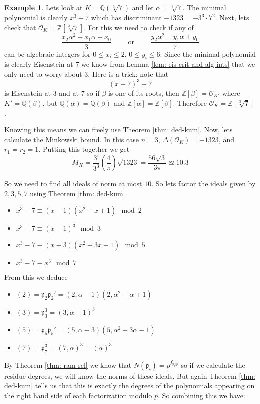 \documentclass[11pt,a4paper]{report}
\theoremstyle{plain}
\theoremstyle{definition}
\newtheorem{exmp}[subsection]{Example}
\theoremstyle{definition}
\newcommand{\ZZ}{\mathbb{Z}}
\def\QQ{\mathbb{Q}}
\def\gothp{\mathfrak{p}}
\def \a{\alpha}
\def \OO {\mathcal{O}}
\begin{document}
\begin{exmp}
	Lets look at $K=\QQ(\sqrt[3]{7})$ and let $\a=\sqrt[3]{7}$. The minimal polynomial is clearly $x^3-7$ which has discriminant $-1323=-3^3 \cdot7^2$. Next, lets check that $\OO_K=\ZZ[\sqrt[3]{7}]$. For this we need to check if any of \[\frac{x_2\a^2+x_1\a+x_0}{3} \qquad \text{ or } \qquad \frac{y_2\a^2+y_1\a+y_0}{7}\] can be algebraic integers for $0 \leq x_i \leq 2$, $0\leq y_i \leq 6$. Since the minimal polynomial is clearly Eisenstein at $7$ we know from Lemma \ref{lem: eis crit and alg ints} that we only need to worry about $3$. Here is a trick: note that \[(x+7)^3-7\] is Eisenstein at $3$ and at $7$ so if $\beta$ is one of its roots, then $\ZZ[\beta]=\OO_{K'}$ where $K'=\QQ(\beta)$, but $\QQ(\a)=\QQ(\beta)$ and $\ZZ[\a]=\ZZ[\beta]$. Therefore $\OO_K=\ZZ[\sqrt[3]{7}]$.
	
	Knowing this means we can freely use Theorem \ref{thm: ded-kum}. Now, lets calculate the Minkowski bound. In this case $n=3$, $\Delta(\OO_K)=-1323$, and $r_1=r_2=1$. Putting this together we get \[M_K=\frac{3!}{3^3}\left(\frac{4}{\pi}\right) \sqrt{1323}= \frac{56\sqrt{3}}{3\pi} \approxeq 10.3\]
	
	So we need to find all ideals of norm at most $10$. So lets factor the ideals given by $2,3,5,7$ using Theorem \ref{thm: ded-kum}.
	
	\begin{itemize}
		\item $x^3-7 \equiv (x-1)(x^2+x+1) \mod 2$
		\item $x^3-7 \equiv (x-1)^3 \mod 3$
		\item $x^3-7 \equiv (x-3)(x^2+3x-1) \mod 5$
		\item $x^3-7 \equiv x^3 \mod 7$
	\end{itemize}
	
	From this we deduce 
	
	\begin{itemize}
		\item $(2)=\gothp_2\gothp_2'=(2,\a-1)(2,\a^2+\a+1)$
		\item $(3)=\gothp_3^3=(3,\a-1)^3$
		\item $(5)=\gothp_5\gothp_5'=(5,\a-3)(5,\a^2+3\a-1)$
		\item $(7)=\gothp_7^3=(7,\a)^3=(\a)^3$
	\end{itemize}
	
	By Theorem \ref{thm: ram-rel} we know that $N({\gothp_i})=p^{f_{\gothp_i|p}}$ so if we calculate the residue degrees, we will know the norms of these ideals. But again Theorem \ref{thm: ded-kum} tells us that this is exactly the degrees of the polynomials appearing on the right hand side of each factorization modulo $p$. So combining this we have:
	

\end{exmp}
\end{document}
